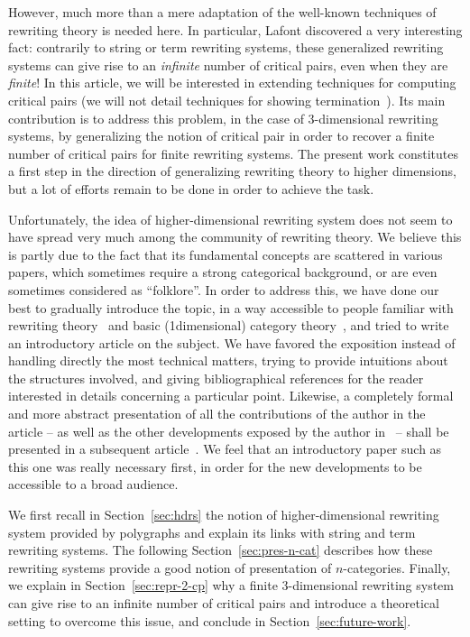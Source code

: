 \documentclass{LMCS}
\begin{document}
However, much more than a mere adaptation of the well-known techniques of
rewriting theory is needed here. In particular, Lafont discovered a very
interesting fact: contrarily to string or term rewriting systems, these
generalized rewriting systems can give rise to an \emph{infinite} number of
critical pairs, even when they are \emph{finite}!
In this article, we will be interested in extending techniques for computing
critical pairs (we will not detail techniques for showing
termination~\cite{guiraud:termination-3-rewr}). Its main contribution is to
address this problem, in the case of 3-dimensional rewriting systems, by
generalizing the notion of critical pair in order to recover a finite number of
critical pairs for finite rewriting systems.
The present work constitutes a first step in the direction of generalizing
rewriting theory to higher dimensions, but a lot of efforts remain to be done in
order to achieve the task.

\bigskip

Unfortunately, the idea of higher-dimensional rewriting system does not seem to
have spread very much among the community of rewriting theory. We believe this
is partly due to the fact that its fundamental concepts are scattered in various
papers, which sometimes require a strong categorical background, or are even
sometimes considered as ``folklore''. In order to address this, we have done our
best to gradually introduce the topic, in a way accessible to people familiar
with rewriting theory~\cite{baader-nipkow:trat, terese:trs} and basic
(1\nbd{}dimensional) category theory~\cite{maclane:cwm}, and tried to write an
introductory article on the subject. We have favored the exposition instead of
handling directly the most technical matters, trying to provide intuitions about
the structures involved, and giving bibliographical references for the reader
interested in details concerning a particular point. Likewise, a completely
formal and more abstract presentation of all the contributions of the author in
the article -- as well as the other developments exposed by the author
in~\cite{mimram:critical-pairs} -- shall be presented in a subsequent
article~\cite{mimram:2-cp}. We feel that an introductory paper such as this one
was really necessary first, in order for the new developments to be accessible
to a broad audience.

\bigskip

We first recall in Section~\ref{sec:hdrs} the notion of higher-dimensional
rewriting system provided by polygraphs and explain its links with string and
term rewriting systems. The following Section~\ref{sec:pres-n-cat} describes how
these rewriting systems provide a good notion of presentation of
$n$-categories. Finally, we explain in Section~\ref{sec:repr-2-cp} why a finite
3-dimensional rewriting system can give rise to an infinite number of critical
pairs and introduce a theoretical setting to overcome this issue, and conclude
in Section~\ref{sec:future-work}.
\end{document}
